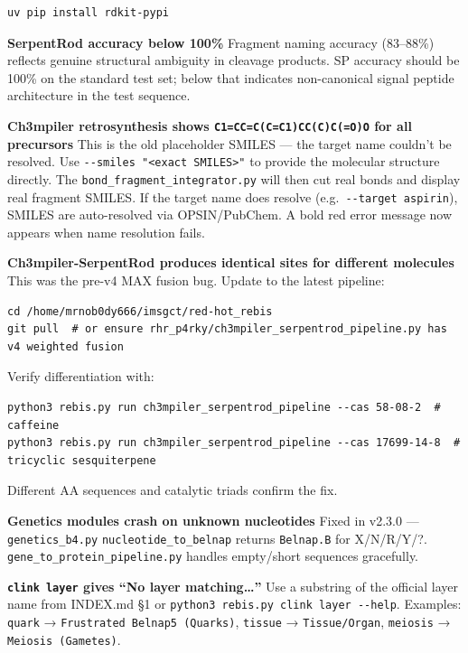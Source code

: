 \documentclass[12pt,a4paper]{article}
\begin{document}
\begin{verbatim}
uv pip install rdkit-pypi
\end{verbatim}

\textbf{SerpentRod accuracy below 100\%} Fragment naming accuracy
(83--88\%) reflects genuine structural ambiguity in cleavage products.
SP accuracy should be 100\% on the standard test set; below that
indicates non-canonical signal peptide architecture in the test
sequence.

\textbf{Ch3mpiler retrosynthesis shows \texttt{C1=CC=C(C=C1)CC(C)C(=O)O}
for all precursors} This is the old placeholder SMILES --- the target
name couldn't be resolved. Use
\texttt{-\/-smiles\ "\textless{}exact\ SMILES\textgreater{}"} to provide
the molecular structure directly. The
\texttt{bond\_fragment\_integrator.py} will then cut real bonds and
display real fragment SMILES. If the target name does resolve
(e.g.~\texttt{-\/-target\ aspirin}), SMILES are auto-resolved via
OPSIN/PubChem. A bold red error message now appears when name resolution
fails.

\textbf{Ch3mpiler-SerpentRod produces identical sites for different
molecules} This was the pre-v4 MAX fusion bug. Update to the latest
pipeline:

\begin{verbatim}
cd /home/mrnob0dy666/imsgct/red-hot_rebis
git pull  # or ensure rhr_p4rky/ch3mpiler_serpentrod_pipeline.py has v4 weighted fusion
\end{verbatim}

Verify differentiation with:

\begin{verbatim}
python3 rebis.py run ch3mpiler_serpentrod_pipeline --cas 58-08-2  # caffeine
python3 rebis.py run ch3mpiler_serpentrod_pipeline --cas 17699-14-8  # tricyclic sesquiterpene
\end{verbatim}

Different AA sequences and catalytic triads confirm the fix.

\textbf{Genetics modules crash on unknown nucleotides} Fixed in v2.3.0
--- \texttt{genetics\_b4.py} \texttt{nucleotide\_to\_belnap} returns
\texttt{Belnap.B} for X/N/R/Y/?. \texttt{gene\_to\_protein\_pipeline.py}
handles empty/short sequences gracefully.

\textbf{\texttt{clink\ layer} gives ``No layer matching\ldots{}''} Use a
substring of the official layer name from INDEX.md §1 or
\texttt{python3\ rebis.py\ clink\ layer\ -\/-help}. Examples:
\texttt{quark} → \texttt{Frustrated\ Belnap5\ (Quarks)}, \texttt{tissue}
→ \texttt{Tissue/Organ}, \texttt{meiosis} → \texttt{Meiosis\ (Gametes)}.
\end{document}

